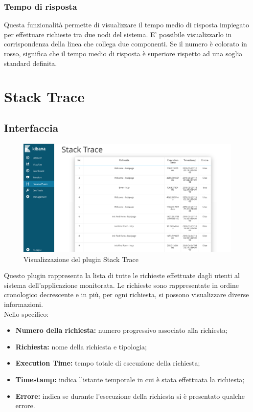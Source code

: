 \subsubsection{Tempo di risposta}
Questa funzionalità permette di visualizzare il tempo medio di risposta impiegato per effettuare richieste tra due nodi del sistema.
E' possibile visualizzarlo in corrispondenza della linea che collega due componenti.
Se il numero è colorato in rosso, significa che il tempo medio di risposta è superiore rispetto ad una soglia standard definita.


\section{Stack Trace}
\label{sec:strace}
\subsection{Interfaccia}
\begin{figure}[H]
	\centering 
	\includegraphics[width=1\textwidth]{Images/stack}
	\caption{Visualizzazione del plugin Stack Trace}
\end{figure}
Questo plugin rappresenta la lista di tutte le richieste effettuate dagli utenti al sistema dell'applicazione monitorata. Le richieste sono rappresentate in ordine cronologico decrescente e in più, per ogni richiesta, si possono visualizzare diverse informazioni.\\ Nello specifico:
   
    \begin{itemize}
    	
    	\item \textbf{Numero della richiesta:} numero progressivo associato alla richiesta;
    	\item \textbf{Richiesta:} nome della richiesta e tipologia;
    	\item \textbf{Execution Time:} tempo totale di esecuzione della richiesta;
    	\item \textbf{Timestamp:} indica l'istante temporale in cui è stata effettuata la richiesta;
    	\item \textbf{Errore:} indica se durante l'esecuzione della richiesta si è presentato qualche errore.
    	
    	\end{itemize}

